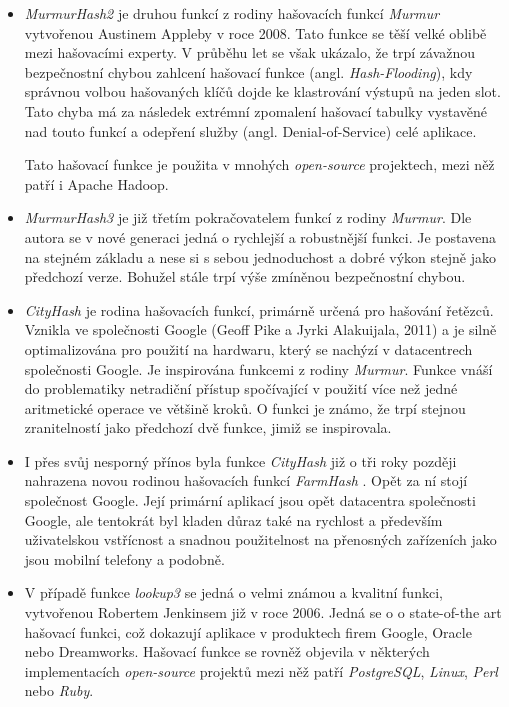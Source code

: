 \begin{itemize}
	\item \textit{MurmurHash2} \cite{murmurhash2} je druhou funkcí z rodiny hašovacích funkcí \textit{Murmur} vytvořenou
		Austinem Appleby v roce 2008. Tato funkce se těší velké oblibě mezi hašovacími experty. V průběhu let se však 
		ukázalo, že trpí závažnou bezpečnostní chybou zahlcení hašovací funkce (angl. \textit{Hash-Flooding}), kdy správnou
		volbou hašovaných klíčů dojde ke klastrování výstupů na jeden slot. Tato chyba má za následek extrémní zpomalení 
		hašovací tabulky vystavěné nad touto funkcí a odepření služby (angl. Denial-of-Service) celé aplikace. 
		
		Tato hašovací funkce je použita v mnohých \textit{open-source} projektech, mezi něž patří i Apache Hadoop. 
		
	\item \textit{MurmurHash3} \cite{murmurhash3} je již třetím pokračovatelem funkcí z rodiny \textit{Murmur}. Dle
		autora se v nové generaci jedná o rychlejší a robustnější funkci. Je postavena na stejném základu a nese si 
		s sebou jednoduchost a dobré výkon stejně jako předchozí verze. Bohužel stále trpí výše zmíněnou bezpečnostní
		chybou.
	
	\item \textit{CityHash} \cite{cityhash_slides} je rodina hašovacích funkcí, primárně určená pro hašování řetězců. 
		Vznikla ve společnosti Google (Geoff Pike a  Jyrki Alakuijala, 2011) a je silně optimalizována pro použití na
		hardwaru, který se nachýzí v datacentrech
		společnosti Google. Je inspirována funkcemi z rodiny \textit{Murmur}. Funkce vnáší do problematiky
		netradiční přístup spočívající v použití více než jedné aritmetické operace ve většině kroků. O funkci je známo,
		že trpí stejnou zranitelností jako předchozí dvě funkce, jimiž se inspirovala.
	
	\item I přes svůj nesporný přínos byla funkce \textit{CityHash} již o tři roky později nahrazena novou rodinou
		hašovacích funkcí \textit{FarmHash} \cite{farmhash} \cite{Simone2014}. Opět za ní stojí společnost Google. Její primární aplikací
		jsou opět datacentra společnosti Google, ale tentokrát byl kladen důraz také na rychlost a především
		uživatelskou vstřícnost a snadnou použitelnost na přenosných zařízeních jako jsou mobilní telefony a podobně.
	
	\item V případě funkce \textit{lookup3} \cite{NCHF_auto_design} se jedná o velmi známou a kvalitní funkci, vytvořenou Robertem Jenkinsem
		již v roce 2006. Jedná se o o state-of-the art hašovací funkci, což dokazují aplikace v produktech firem
		Google, Oracle nebo Dreamworks. Hašovací funkce se rovněž objevila v některých implementacích \textit{open-source}
		projektů mezi něž patří \textit{PostgreSQL}, \textit{Linux}, \textit{Perl} nebo \textit{Ruby}.
	

\end{itemize}
